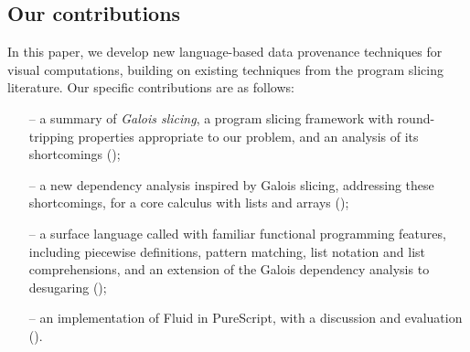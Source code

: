 \subsection{Our contributions}

In this paper, we develop new language-based data provenance techniques for visual computations, building on existing techniques from the program slicing literature. Our specific contributions are as follows:

\begin{itemize}
   \item[--] a summary of \emph{Galois slicing}, a program slicing framework with round-tripping properties appropriate to our problem, and an analysis of its shortcomings ();
   \item[--] a new dependency analysis inspired by Galois slicing, addressing these shortcomings, for a core calculus with lists and arrays ();
   \item[--] a surface language called \OurLanguage with familiar functional programming features, including piecewise definitions, pattern matching, list notation and list comprehensions, and an extension of the Galois dependency analysis to desugaring ();
   \item[--] an implementation of Fluid in PureScript, with a discussion and evaluation ().
\end{itemize}
